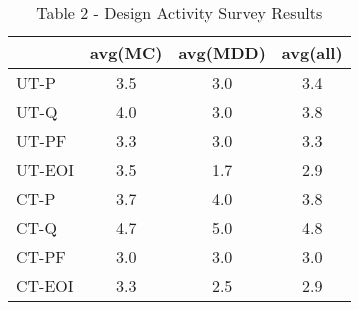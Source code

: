 \documentclass[final_report_innit.tex]{subfiles}
\begin{document}
\begin{table}[h]
\caption{Table 2 - Design Activity Survey Results}
\centering
\begin{tabular}{@{}l|c|c|c|@{}}
\cmidrule(l){2-4}
                             & \multicolumn{1}{l|}{avg(MC)} & \multicolumn{1}{l|}{avg(MDD)} & \multicolumn{1}{l|}{avg(all)} \\ \midrule
\multicolumn{1}{|l|}{UT-P}   & 3.5                          & 3.0                           & 3.4                           \\ \midrule
\multicolumn{1}{|l|}{UT-Q}   & 4.0                          & 3.0                           & 3.8                           \\ \midrule
\multicolumn{1}{|l|}{UT-PF}  & 3.3                          & 3.0                           & 3.3                           \\ \midrule
\multicolumn{1}{|l|}{UT-EOI} & 3.5                          & 1.7                           & 2.9                           \\ \midrule
\multicolumn{1}{|l|}{CT-P}   & 3.7                          & 4.0                           & 3.8                           \\ \midrule
\multicolumn{1}{|l|}{CT-Q}   & 4.7                          & 5.0                           & 4.8                           \\ \midrule
\multicolumn{1}{|l|}{CT-PF}  & 3.0                          & 3.0                           & 3.0                           \\ \midrule
\multicolumn{1}{|l|}{CT-EOI} & 3.3                          & 2.5                           & 2.9                           \\ \bottomrule
\end{tabular}
\end{table}
\end{document}
